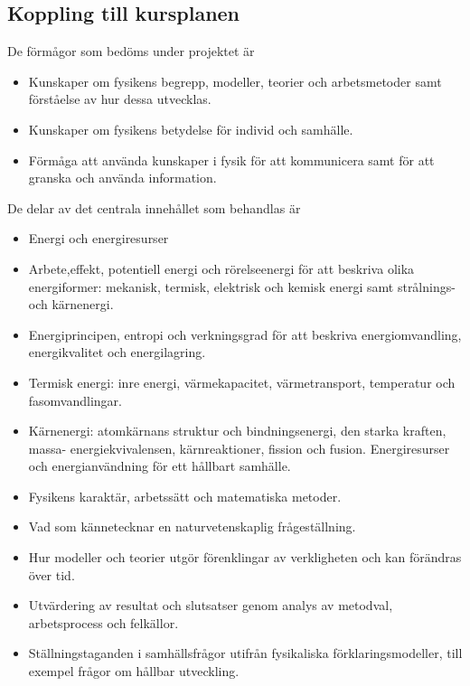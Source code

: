 \documentclass[11pt]{article}
\begin{document}
    \subsection{Koppling till kursplanen}
    De förmågor som bedöms under projektet är
    \begin{itemize}
        \item Kunskaper om fysikens begrepp, modeller, teorier och arbetsmetoder samt förståelse av hur
    dessa utvecklas.
        \item Kunskaper om fysikens betydelse för individ och samhälle.
        \item Förmåga att använda kunskaper i fysik för att kommunicera samt för att granska och
    använda information.
   \end{itemize}
    De delar av det centrala innehållet som behandlas är
    \begin{itemize}
    \item Energi och energiresurser
    \item Arbete,effekt, potentiell energi och rörelseenergi för att beskriva olika energiformer:
    mekanisk, termisk, elektrisk och kemisk energi samt strålnings- och kärnenergi.
    \item Energiprincipen, entropi och verkningsgrad för att beskriva energiomvandling,
    energikvalitet och energilagring.
    \item Termisk energi: inre energi, värmekapacitet, värmetransport, temperatur och
    fasomvandlingar.
    \item Kärnenergi: atomkärnans struktur och bindningsenergi, den starka kraften, massa-
    energiekvivalensen, kärnreaktioner, fission och fusion. Energiresurser och energianvändning
    för ett hållbart samhälle.
    \item Fysikens karaktär, arbetssätt och matematiska metoder.
    \item Vad som kännetecknar en naturvetenskaplig frågeställning.
    \item Hur modeller och teorier utgör förenklingar av verkligheten och kan förändras över tid.
    \item Utvärdering av resultat och slutsatser genom analys av metodval, arbetsprocess och
    felkällor.
    \item Ställningstaganden i samhällsfrågor utifrån fysikaliska förklaringsmodeller, till
    exempel frågor om hållbar utveckling.
    \end{itemize}
\end{document}
